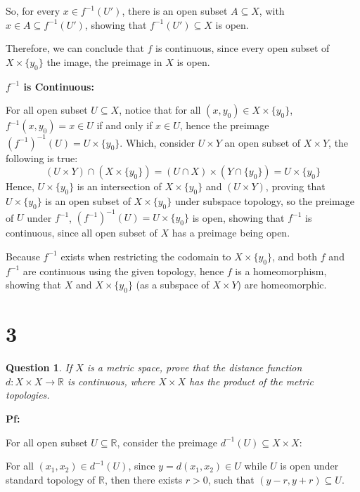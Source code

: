 \documentclass{article}
\newtheorem{question}{Question}
\begin{document}
So, for every $x\in f^{-1}(U')$, there is an open subset $A\subseteq X$, with $x\in A\subseteq f^{-1}(U')$, showing that $f^{-1}(U')\subseteq X$ is open.

Therefore, we can conclude that $f$ is continuous, since every open subset of $X\times \{y_0\}$ the image, the preimage in $X$ is open.

\hfill

\textbf{$f^{-1}$ is Continuous:}

For all open subset $U\subseteq X$, notice that for all $(x,y_0)\in X\times \{y_0\}$, $f^{-1}(x,y_0)=x\in U$ if and only if $x\in U$,
hence the preimage $(f^{-1})^{-1}(U) = U\times \{y_0\}$. Which, consider $U\times Y$ an open subset of $X\times Y$, the following is true:
$$(U\times Y)\cap (X\times \{y_0\}) = (U\cap X)\times (Y\cap \{y_0\}) = U\times \{y_0\}$$
Hence, $U\times \{y_0\}$ is an intersection of $X\times \{y_0\}$ and $(U\times Y)$, proving that $U\times \{y_0\}$ is an open subset of $X\times \{y_0\}$ under subspace topology,
so the preimage of $U$ under $f^{-1}$, $(f^{-1})^{-1}(U) = U\times \{y_0\}$ is open, showing that $f^{-1}$ is continuous, since all open subset of $X$ has a preimage being open.

\hfill

Because $f^{-1}$ exists when restricting the codomain to $X\times \{y_0\}$, and both $f$ and $f^{-1}$ are continuous using the given topology,
hence $f$ is a homeomorphism, showing that $X$ and $X\times \{y_0\}$ (as a subspace of $X\times Y$) are homeomorphic.

\break

\section*{3}
\begin{myBox}[]{}
    \begin{question}
        If $X$ is a metric space, prove that the distance function $d:X\times X\rightarrow \mathbb{R}$ is
        continuous, where $X\times X$ has the product of the metric topologies.
    \end{question}
\end{myBox}

\textbf{Pf:}

For all open subset $U\subseteq \mathbb{R}$, consider the preimage $d^{-1}(U)\subseteq X\times X$:

For all $(x_1,x_2)\in d^{-1}(U)$, since $y=d(x_1,x_2)\in U$ while $U$ is open under standard topology of $\mathbb{R}$, 
then there exists $r>0$, such that $(y-r,y+r) \subseteq U$.
\end{document}
